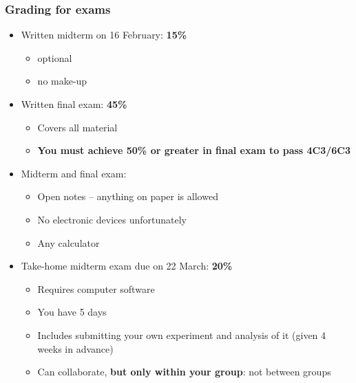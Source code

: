 \begin{frame}\frametitle{Grading for exams}
	\begin{itemize}
		\item	Written midterm on 16 February: \textbf{15\%} 
		\begin{itemize}
			\item	optional 
			\item	no make-up 
		\end{itemize}
	\end{itemize}
	\begin{itemize}
		\item	Written final exam: \textbf{45\%} 
		\begin{itemize}
			\item	Covers all material 
			\item	\textbf{You must achieve 50\% or greater in final exam to pass 4C3/6C3}
		\end{itemize}
	\end{itemize}
	\begin{itemize}
		\item	Midterm and final exam: 
		\begin{itemize}
			\item	Open notes -- anything on paper is allowed 
			\item	No electronic devices unfortunately 
			\item	Any calculator 
		\end{itemize}
	\end{itemize}
	\begin{itemize}
		\item	Take-home midterm exam due on 22 March: \textbf{20\%} 
		\begin{itemize}
			\item	Requires computer software 
			\item	You have 5 days 
			\item	Includes submitting your own experiment and analysis of it (given 4 weeks in advance) 
			\item	Can collaborate, \textbf{but only within your group}: not between groups 
		\end{itemize}
	\end{itemize}
\end{frame}

